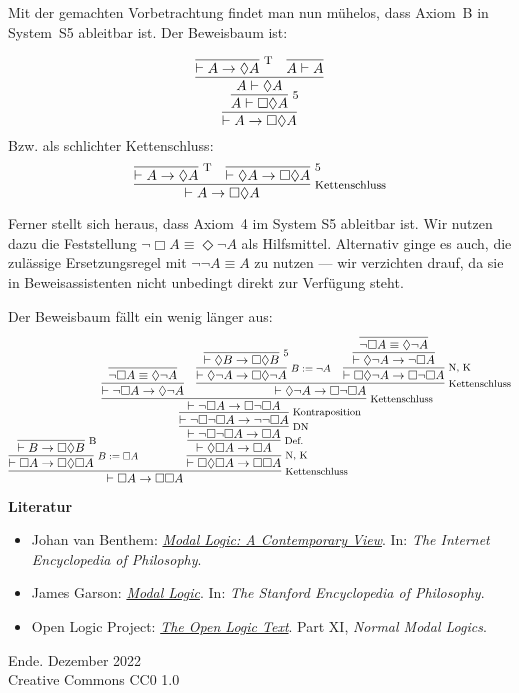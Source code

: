 \documentclass[8pt]{beamer}
\newcommand{\modest}[1]{{\small\color{gray}#1}}
\newcommand{\strong}[1]{\textsf{\textbf{#1}}}
\newcommand{\infernote}[1]{\!\text{\footnotesize #1}}
\newcommand{\parspace}{\vspace{0.8em}}
\newcommand{\cond}{\rightarrow}
\newcommand{\lnec}{\Box}
\newcommand{\lpos}{\Diamond}
\begin{document}
\begin{frame}
Mit der gemachten Vorbetrachtung findet man nun mühelos, dass Axiom~B
in System~S5 ableitbar ist. Der Beweisbaum ist:\pause

\[
\infer{\vdash A\cond\lnec\lpos A}{
  \infer[\infernote{5}]{A\vdash\lnec\lpos A}{
    \infer{A\vdash\lpos A}{
      \infer[\infernote{T}]{\vdash A\cond\lpos A}{}
    & \infer{A\vdash A}{}}}}
\]
Bzw. als schlichter Kettenschluss:
\[
\infer[\infernote{Kettenschluss}]{\vdash A\cond\lnec\lpos A}{
  \infer[\infernote{T}]{\vdash A\cond\lpos A}{}
& \infer[\infernote{5}]{\vdash\lpos A\cond\lnec\lpos A}{}
}
\]
\end{frame}

\begin{frame}
Ferner stellt sich heraus, dass Axiom~4 im System S5 ableitbar ist.
Wir nutzen dazu die Feststellung $\neg\lnec A\equiv\lpos\neg A$
als Hilfsmittel. Alternativ ginge es auch, die zulässige
Ersetzungsregel mit $\neg\neg A\equiv A$ zu nutzen --- wir verzichten drauf,
da sie in Beweisassistenten nicht unbedingt direkt zur
Verfügung steht.

\parspace
Der Beweisbaum fällt ein wenig länger aus:\pause
\[
\infer[\infernote{Kettenschluss}]{\vdash\lnec A\cond\lnec\lnec A}{
  \infer[\infernote{$B:=\lnec A$}]{\vdash\lnec A\cond\lnec\lpos\lnec A}{
    \infer[\infernote{B}]{\vdash B\cond\lnec \lpos B}{}}
& \hspace{-4em}\infer[\infernote{N, K}]{\vdash\lnec\lpos\lnec A\cond\lnec\lnec A}{
    \infer[\infernote{Def.}]{\vdash\lpos\lnec A\cond\lnec A}{
      \infer[\infernote{DN}]{\vdash\neg\lnec\neg\lnec A\cond\lnec A}{
        \infer[\infernote{Kontraposition}]{\vdash\neg\lnec\neg\lnec A\cond\neg\neg\lnec A}{
          \infer[\infernote{Kettenschluss}]{\vdash\neg\lnec A\cond\lnec\neg\lnec A}{
            \infer{\vdash\neg\lnec A\cond\lpos\neg A}{
              \infer{\neg\lnec A\equiv\lpos\neg A}{}}
          & \infer[\infernote{Kettenschluss}]{\vdash\lpos\neg A\cond\lnec\neg\lnec A}{
              \infer[\infernote{$B:=\neg A$}]{\vdash\lpos\neg A\cond\lnec\lpos\neg A}{
                \infer[\infernote{5}]{\vdash\lpos B\cond\lnec\lpos B}{}}
            & \infer[\infernote{N, K}]{\vdash\lnec\lpos\neg A\cond\lnec\neg\lnec A}{
                \infer{\vdash\lpos\neg A\cond\neg\lnec A}{
                  \infer{\neg\lnec A\equiv\lpos\neg A}{}}}}}}}}}}
\]
\end{frame}

\begin{frame}
\strong{Literatur}
\begin{itemize}
\item Johan van Benthem: \href{https://iep.utm.edu/modal-lo/}{\emph{Modal Logic: A Contemporary View}}.
In: \emph{The Internet Encyclopedia of Philosophy}.
\item James Garson: \href{https://plato.stanford.edu/entries/logic-modal/}{\emph{Modal Logic}}.
In: \emph{The Stanford Encyclopedia of Philosophy}.
\item Open Logic Project: \href{https://openlogicproject.org/}{\emph{The Open Logic Text}}.
  Part XI, \emph{Normal Modal Logics}.
\end{itemize}
\end{frame}

\begin{frame}
Ende.
\vfill\hfill\modest{Dezember 2022}\\
\hfill\modest{Creative Commons CC0 1.0}
\end{frame}
\end{document}
